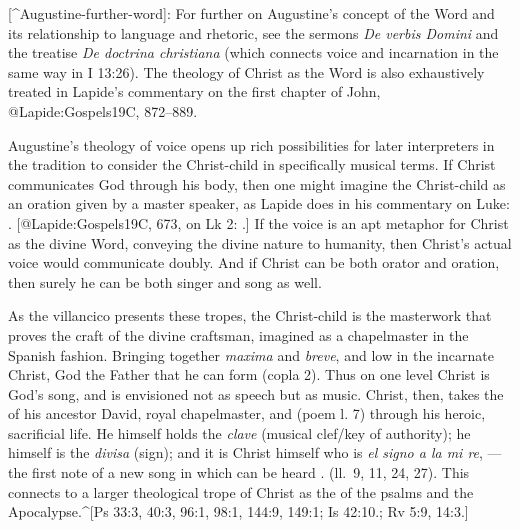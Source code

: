 [^Augustine-further-word]:
For further on Augustine's concept of the Word and its relationship to language
and rhetoric, see the sermons \emph{De verbis Domini} and the treatise \emph{De doctrina
christiana} (which connects voice and incarnation in the same way in I 13:26).
The theology of Christ as the Word is also exhaustively treated in Lapide's
commentary on the first chapter of John, @Lapide:Gospels19C, 872--889.

Augustine's theology of voice opens up rich possibilities for later interpreters
in the tradition to consider the Christ-child in specifically musical terms.
If Christ communicates God through his body, then one might imagine the 
Christ-child as an oration given by a master speaker, as Lapide does in his
commentary on Luke:
. [@Lapide:Gospels19C, 673, on Lk 2:
.] 
If the voice is an apt metaphor for Christ as the divine Word, conveying the
divine nature to humanity, then Christ's actual voice would communicate doubly.
And if Christ can be both orator and oration, then surely he can be both singer
and song as well.

As the villancico  presents these tropes, the
Christ-child is the masterwork that proves the craft of the divine
craftsman, imagined as a chapelmaster in the Spanish fashion.
Bringing together \emph{maxima} and \emph{breve},  and low in the incarnate Christ,
God the Father  that he can form 
(copla 2).
Thus on one level Christ is God's song, and  is envisioned not as
speech but as music.
Christ, then, takes the  of his ancestor David, royal chapelmaster, and
 (poem l. 7) through his heroic, sacrificial life.
He himself holds the \emph{clave} (musical clef/key of authority); he himself is the
\emph{divisa} (sign); and it is Christ himself who is \emph{el signo a la mi
re}, ---the first note of a new song in which can be heard . (ll.~9, 11, 24, 27).
This connects to a larger theological trope of Christ as the  of
the psalms and the Apocalypse.^[Ps 33:3, 40:3, 96:1, 98:1, 144:9, 149:1; Is
42:10.; Rv 5:9, 14:3.]


